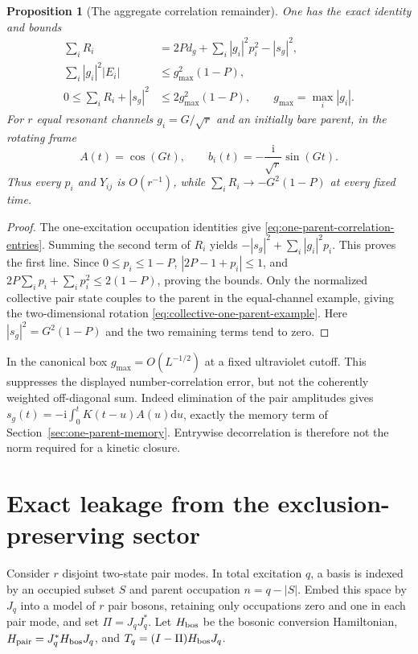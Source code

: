 \documentclass[11pt,a4paper,oneside]{book}
\theoremstyle{plain}
\newtheorem{proposition}[theorem]{Proposition}
\theoremstyle{definition}
\theoremstyle{remark}
\newcommand{\dd}{\mathrm d}
\newcommand{\ii}{\mathrm i}
\newcommand{\src}[2]{\cite{#1}}
\begin{document}
\begin{proposition}[The aggregate correlation remainder]
\label{prop:weighted-coherence}
One has the exact identity and bounds
\begin{equation}
 \begin{split}
 \sum_iR_i&=2P d_g+\sum_i|g_i|^2p_i^2-|s_g|^2,\\
 \sum_i|g_i|^2|E_i|&\le g_{\max}^2(1-P),\\
 0\le\sum_iR_i+|s_g|^2&\le2g_{\max}^2(1-P),
 \qquad g_{\max}=\max_i|g_i|.
 \end{split}
 \label{eq:weighted-residual-identity}
\end{equation}
For $r$ equal resonant channels $g_i=G/\sqrt r$ and an initially bare
parent, in the rotating frame
\begin{equation}
 A(t)=\cos(Gt),\qquad b_i(t)=-\frac{\ii}{\sqrt r}\sin(Gt).
 \label{eq:collective-one-parent-example}
\end{equation}
Thus every $p_i$ and $Y_{ij}$ is $O(r^{-1})$, while
$\sum_iR_i\to-G^2(1-P)$ at every fixed time.
\end{proposition}
\begin{proof}
The one-excitation occupation identities give
\eqref{eq:one-parent-correlation-entries}.  Summing the second term
of $R_i$ yields $-|s_g|^2+\sum_i|g_i|^2p_i$.  This proves the first
line.  Since $0\le p_i\le1-P$,
$|2P-1+p_i|\le1$, and
$2P\sum_i p_i+\sum_i p_i^2\le2(1-P)$, proving the bounds.
Only the normalized collective pair state couples to the parent in
the equal-channel example, giving the two-dimensional rotation
\eqref{eq:collective-one-parent-example}.  Here
$|s_g|^2=G^2(1-P)$ and the two remaining terms tend to zero.
\end{proof}
\src{R20}{thm:v20v56-residual,prop:v20v56-collective}

In the canonical box $g_{\max}=O(L^{-1/2})$ at a fixed ultraviolet
cutoff.  This suppresses the displayed number-correlation error, but
not the coherently weighted off-diagonal sum.  Indeed elimination of
the pair amplitudes gives
$s_g(t)=-\ii\int_0^t K(t-u)A(u)\dd u$, exactly the memory term of
Section~\ref{sec:one-parent-memory}.  Entrywise decorrelation is
therefore not the norm required for a kinetic closure.

\section{Exact leakage from the exclusion-preserving sector}
\label{sec:hard-pair-leakage}
Consider $r$ disjoint two-state pair modes.  In total excitation $q$,
a basis is indexed by an occupied subset $S$ and parent occupation
$n=q-|S|$.  Embed this space by $J_q$ into a model of $r$ pair bosons,
retaining only occupations zero and one in each pair mode, and set
$\Pi=J_qJ_q^*$.  Let $H_{\rm bos}$ be the bosonic conversion Hamiltonian,
$H_{\rm pair}=J_q^*H_{\rm bos}J_q$, and
$T_q=(I-\Pi)H_{\rm bos}J_q$.
\end{document}
